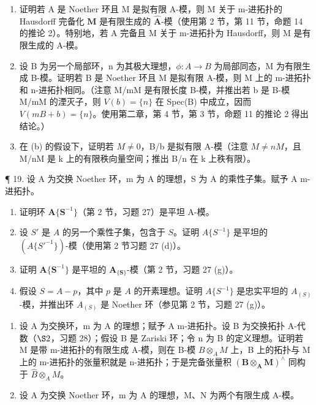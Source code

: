 \begin{enumerate}
\def\labelenumi{(\alph{enumi})}
\item
  证明若 A 是 Noether 环且 M 是拟有限 A-模，则 M 关于 m-进拓扑的 Hausdorff 完备化 \(\hat{\mathbf{M}}\) 是有限生成的 \(\hat{\mathbf{A}}\)-模（使用第 2 节，第 11 节，命题 14 的推论 2）。特别地，若 A 完备且 M 关于 m-进拓扑为 Hausdorff，则 M 是有限生成的 A-模。
\item
  设 B 为另一个局部环，n 为其极大理想，\(\phi: A \rightarrow B\) 为局部同态，M 为有限生成 B-模。证明若 B 是 Noether 环且 M 是拟有限 A-模，则 M 上的 m-进拓扑和 n-进拓扑相同。（注意 M/mM 是有限长度 B-模，并推出若 b 是 B-模 M/mM 的湮灭子，则 \(V(b) = \{n\}\) 在 Spec(B) 中成立，因而 \(V(mB + b) = \{n\}\)。使用第二章，第 4 节，第 3 节，命题 11 的推论 2 得出结论。）
\item
  在 (b) 的假设下，证明若 \(M \neq 0\)，B/b 是拟有限 A-模（注意 \(M \neq nM\)，且 M/nM 是 k 上的有限秩向量空间；推出 B/n 在 k 上秩有限）。
\end{enumerate}

¶ 19. 设 A 为交换 Noether 环，m 为 A 的理想，S 为 A 的乘性子集。赋予 A m-进拓扑。

\begin{enumerate}
\def\labelenumi{(\alph{enumi})}
\item
  证明环 \(\mathbf{A}\{\mathbf{S}^{-1}\}\)（第 2 节，习题 27）是平坦 A-模。
\item
   设 \(S'\) 是 \(A\) 的另一个乘性子集，包含于 \(S\)。证明 \(A\{S^{-1}\}\) 是平坦的 \((A\{S'^{-1}\})\)-模（使用第 2 节习题 27 (d)）。
\item
  证明 \(\mathbf{A}\{\mathbf{S}^{-1}\}\) 是平坦的 \(\mathbf{A}_{\{\mathbf{S}\}}\)-模（第 2 节，习题 27 (g)）。
\item
   假设 \(S = A - p\)，其中 \(p\) 是 \(A\) 的开素理想。证明 \(A\{S^{-1}\}\) 是忠实平坦的 \(A_{(S)}\)-模，并推出环 \(A_{(S)}\) 是 Noether 环（参见第 2 节，习题 27 (g)）。~
\end{enumerate}

\begin{enumerate}
\def\labelenumi{\arabic{enumi}.}
\setcounter{enumi}{19}
\item
  设 A 为交换环，m 为 A 的理想；赋予 A m-进拓扑。设 B 为交换拓扑 A-代数（\(\S 2\)，习题 28）；假设 B 是 Zariski 环；令 n 为 B 的定义理想。证明若 M 是带 m-进拓扑的有限生成 A-模，则在 B-模 \(B \otimes_{A} M\) 上，B 上的拓扑与 M 上的 m-进拓扑的张量积就是 n-进拓扑；于是完备张量积 \((\mathbf{B} \otimes_{\mathbf{A}} \mathbf{M})^{\wedge}\) 同构于 \(\hat{B} \otimes_{A} M\)。
\item
  设 A 为交换 Noether 环，m 为 A 的理想，M、N 为两个有限生成 A-模。
\end{enumerate}

